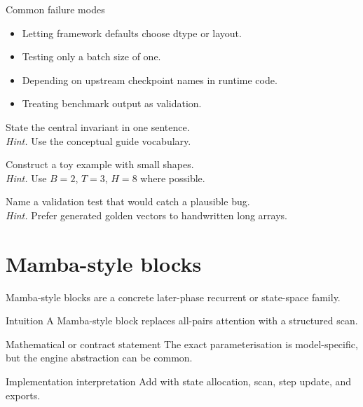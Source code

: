 \begin{warningbox}{Common failure modes}
\begin{itemize}
\item Letting framework defaults choose dtype or layout.
\item Testing only a batch size of one.
\item Depending on upstream checkpoint names in runtime code.
\item Treating benchmark output as validation.
\end{itemize}
\end{warningbox}

\begin{chapterexercises}
\item State the central invariant in one sentence.\\
\textit{Hint.} Use the conceptual guide vocabulary.
\item Construct a toy example with small shapes.\\
\textit{Hint.} Use $B=2$, $T=3$, $H=8$ where possible.
\item Name a validation test that would catch a plausible bug.\\
\textit{Hint.} Prefer generated golden vectors to handwritten long arrays.
\end{chapterexercises}

\chapter{Mamba-style blocks}
\label{ch:mamba-blocks}
Mamba-style blocks are a concrete later-phase recurrent or state-space family. \citep{gu2024mamba}



\begin{intuitionbox}{Intuition}
A Mamba-style block replaces all-pairs attention with a structured scan.
\end{intuitionbox}

\begin{definitionbox}{Mathematical or contract statement}
The exact parameterisation is model-specific, but the engine abstraction can be common.
\end{definitionbox}

\begin{implementationbox}{Implementation interpretation}
Add  with state allocation, scan, step update, and exports.
\end{implementationbox}

